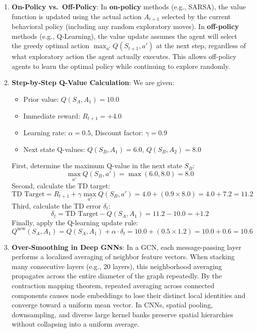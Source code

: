 \begin{enumerate}
    \item \textbf{On-Policy vs.\ Off-Policy}:
    In \textbf{on-policy} methods (e.g., SARSA), the value function is updated using the actual action $A_{t+1}$ selected by the current behavioral policy (including any random exploratory moves). In \textbf{off-policy} methods (e.g., Q-Learning), the value update assumes the agent will select the greedy optimal action $\max_{a'} Q(S_{t+1}, a')$ at the next step, regardless of what exploratory action the agent actually executes. This allows off-policy agents to learn the optimal policy while continuing to explore randomly.

    \item \textbf{Step-by-Step Q-Value Calculation}:
    We are given:
    \begin{itemize}
        \item Prior value: $Q(S_A, A_1) = 10.0$
        \item Immediate reward: $R_{t+1} = +4.0$
        \item Learning rate: $\alpha = 0.5$, Discount factor: $\gamma = 0.9$
        \item Next state Q-values: $Q(S_B, A_1) = 6.0$, $Q(S_B, A_2) = 8.0$
    \end{itemize}
    First, determine the maximum Q-value in the next state $S_B$:
    \begin{equation*}
    \max_{a'} Q(S_B, a') = \max(6.0, 8.0) = 8.0
    \end{equation*}
    Second, calculate the TD target:
    \begin{equation*}
    \text{TD Target} = R_{t+1} + \gamma \max_{a'} Q(S_B, a') = 4.0 + (0.9 \times 8.0) = 4.0 + 7.2 = 11.2
    \end{equation*}
    Third, calculate the TD error $\delta_t$:
    \begin{equation*}
    \delta_t = \text{TD Target} - Q(S_A, A_1) = 11.2 - 10.0 = +1.2
    \end{equation*}
    Finally, apply the Q-learning update rule:
    \begin{equation*}
    Q^{\text{new}}(S_A, A_1) = Q(S_A, A_1) + \alpha \cdot \delta_t = 10.0 + (0.5 \times 1.2) = 10.0 + 0.6 = \mathbf{10.6}
    \end{equation*}

    \item \textbf{Over-Smoothing in Deep GNNs}:
    In a GCN, each message-passing layer performs a localized averaging of neighbor feature vectors. When stacking many consecutive layers (e.g., 20 layers), this neighborhood averaging propagates across the entire diameter of the graph repeatedly. By the contraction mapping theorem, repeated averaging across connected components causes node embeddings to lose their distinct local identities and converge toward a uniform mean vector. In CNNs, spatial pooling, downsampling, and diverse large kernel banks preserve spatial hierarchies without collapsing into a uniform average.


\end{enumerate}
